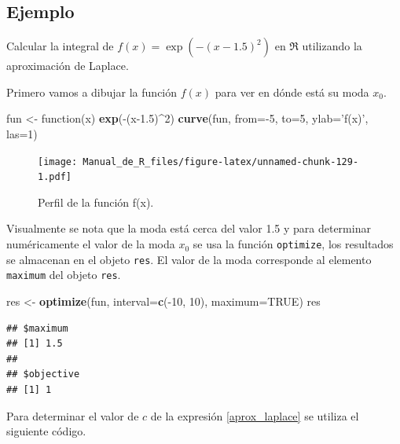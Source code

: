 \documentclass[10pt,]{krantz}
\makeatletter
\newenvironment{Shaded}{\begin{snugshade}}{\end{snugshade}}
\newcommand{\KeywordTok}[1]{\textcolor[rgb]{0.13,0.29,0.53}{\textbf{{#1}}}}
\newcommand{\DataTypeTok}[1]{\textcolor[rgb]{0.13,0.29,0.53}{{#1}}}
\newcommand{\DecValTok}[1]{\textcolor[rgb]{0.00,0.00,0.81}{{#1}}}
\newcommand{\FloatTok}[1]{\textcolor[rgb]{0.00,0.00,0.81}{{#1}}}
\newcommand{\StringTok}[1]{\textcolor[rgb]{0.31,0.60,0.02}{{#1}}}
\newcommand{\OtherTok}[1]{\textcolor[rgb]{0.56,0.35,0.01}{{#1}}}
\newcommand{\NormalTok}[1]{{#1}}
\newenvironment{kframe}{%
\medskip{}
\setlength{\fboxsep}{.8em}
 \def\at@end@of@kframe{}%
 \ifinner\ifhmode%
  \def\at@end@of@kframe{\end{minipage}}%
  \begin{minipage}{\columnwidth}%
 \fi\fi%
 \def\FrameCommand##1{\hskip\@totalleftmargin \hskip-\fboxsep
 \colorbox{shadecolor}{##1}\hskip-\fboxsep
     \hskip-\linewidth \hskip-\@totalleftmargin \hskip\columnwidth}%
 \MakeFramed {\advance\hsize-\width
   \@totalleftmargin\z@ \linewidth\hsize
   \@setminipage}}%
 {\par\unskip\endMakeFramed%
 \at@end@of@kframe}
\renewenvironment{Shaded}{\begin{kframe}}{\end{kframe}}
\makeatother
\begin{document}
\subsection*{Ejemplo}\label{ejemplo-30}


Calcular la integral de \(f(x)=\exp \left( -(x-1.5)^2 \right)\) en
\(\Re\) utilizando la aproximación de Laplace.

Primero vamos a dibujar la función \(f(x)\) para ver en dónde está su
moda \(x_0\).

\begin{Shaded}
\begin{Highlighting}[]
\NormalTok{fun <-}\StringTok{ }\NormalTok{function(x) }\KeywordTok{exp}\NormalTok{(-(x}\FloatTok{-1.5}\NormalTok{)^}\DecValTok{2}\NormalTok{)}
\KeywordTok{curve}\NormalTok{(fun, }\DataTypeTok{from=}\NormalTok{-}\DecValTok{5}\NormalTok{, }\DataTypeTok{to=}\DecValTok{5}\NormalTok{, }\DataTypeTok{ylab=}\StringTok{'f(x)'}\NormalTok{, }\DataTypeTok{las=}\DecValTok{1}\NormalTok{)}
\end{Highlighting}
\end{Shaded}

\begin{figure}[htbp]
\centering
\texttt{[image: Manual\_de\_R\_files/figure-latex/unnamed-chunk-129-1.pdf]}
\caption{\label{fig:unnamed-chunk-129}Perfil de la función f(x).}
\end{figure}

Visualmente se nota que la moda está cerca del valor 1.5 y para
determinar numéricamente el valor de la moda \(x_0\) se usa la función
\texttt{optimize}, los resultados se almacenan en el objeto
\texttt{res}. El valor de la moda corresponde al elemento
\texttt{maximum} del objeto \texttt{res}.

\begin{Shaded}
\begin{Highlighting}[]
\NormalTok{res <-}\StringTok{ }\KeywordTok{optimize}\NormalTok{(fun, }\DataTypeTok{interval=}\KeywordTok{c}\NormalTok{(-}\DecValTok{10}\NormalTok{, }\DecValTok{10}\NormalTok{), }\DataTypeTok{maximum=}\OtherTok{TRUE}\NormalTok{)}
\NormalTok{res}
\end{Highlighting}
\end{Shaded}

\begin{verbatim}
## $maximum
## [1] 1.5
## 
## $objective
## [1] 1
\end{verbatim}

Para determinar el valor de \(c\) de la expresión \ref{aprox_laplace} se
utiliza el siguiente código.
\end{document}
